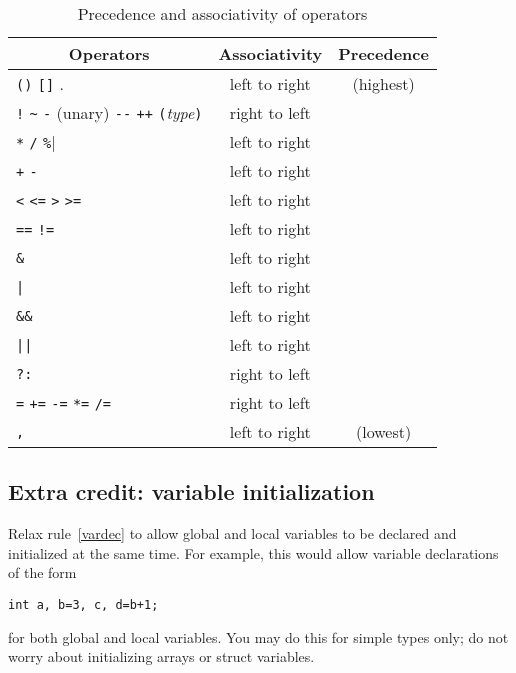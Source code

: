 \documentclass{article}
\begin{document}
\begin{table}[t]
\begin{center}
\begin{tabular}{@{}l|c|c}
\hline
  \multicolumn{1}{c|}{\sc Operators}
&
  {\sc Associativity}
&
  {\sc Precedence}
\\ \hline
  \verb|()| \quad \verb|[]| \quad .
  &
  left to right
  &
  (highest)
\\
  \verb|!| \quad \verb|~| \quad \verb|-| (unary)
  \quad \verb|--| \quad \verb|++|
  \quad \verb|(|\emph{type}\verb|)|
  &
  right to left
\\
  \verb|*| \quad \verb|/| \quad \verb|%|
  &
  left to right
\\
  \verb|+| \quad \verb|-|
  &
  left to right
\\
  \verb|<| \quad \verb|<=| \quad \verb|>| \quad \verb|>=|
  &
  left to right
\\
  \verb|==| \quad \verb|!=|
  &
  left to right
\\
  \verb|&|
  &
  left to right
\\
  \verb$|$
  &
  left to right
\\
  \verb|&&|
  &
  left to right
\\
  \verb$||$
  &
  left to right
\\
  \verb$?:$
  &
  right to left
\\
  \verb|=| \quad \verb|+=| \quad \verb|-=| \quad \verb|*=| \quad \verb|/=|
  &
  right to left
\\
  \verb|,|
  &
  left to right
  &
  (lowest)
\\ \hline
\end{tabular}
\end{center}
\caption{Precedence and associativity of operators}
\label{TAB:precedence}
\end{table}


\subsection{Extra credit: variable initialization}
\label{SEC:firstextra}
\label{SEC:varinit}

Relax rule~\ref{vardec} to allow global and local variables to be
declared and initialized at the same time.
For example, this would allow variable declarations of the form
\begin{lstlisting}[numbers=none]
  int a, b=3, c, d=b+1;
\end{lstlisting}
for both global and local variables.
You may do this for simple types only;
do not worry about initializing arrays or struct variables.
\end{document}
